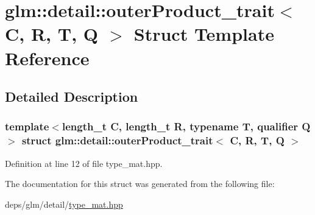 \hypertarget{structglm_1_1detail_1_1outerProduct__trait}{}\section{glm\+:\+:detail\+:\+:outer\+Product\+\_\+trait$<$ C, R, T, Q $>$ Struct Template Reference}
\label{structglm_1_1detail_1_1outerProduct__trait}


\subsection{Detailed Description}
\subsubsection*{template$<$length\+\_\+t C, length\+\_\+t R, typename T, qualifier Q$>$\newline
struct glm\+::detail\+::outer\+Product\+\_\+trait$<$ C, R, T, Q $>$}



Definition at line 12 of file type\+\_\+mat.\+hpp.



The documentation for this struct was generated from the following file\+:\begin{DoxyCompactItemize}
\item 
deps/glm/detail/\hyperlink{type__mat_8hpp}{type\+\_\+mat.\+hpp}\end{DoxyCompactItemize}
